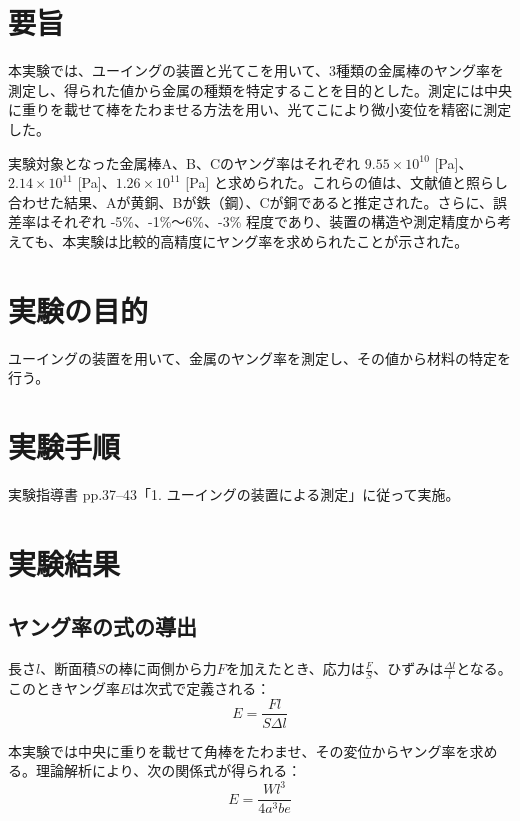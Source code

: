 \documentclass[a4paper,11pt,dvipdfmx]{jsarticle}
\begin{document}
\maketitle

\section{要旨}
本実験では、ユーイングの装置と光てこを用いて、3種類の金属棒のヤング率を測定し、得られた値から金属の種類を特定することを目的とした。測定には中央に重りを載せて棒をたわませる方法を用い、光てこにより微小変位を精密に測定した。

実験対象となった金属棒A、B、Cのヤング率はそれぞれ \(9.55 \times 10^{10}\) [Pa]、\(2.14 \times 10^{11}\) [Pa]、\(1.26 \times 10^{11}\) [Pa] と求められた。これらの値は、文献値と照らし合わせた結果、Aが黄銅、Bが鉄（鋼）、Cが銅であると推定された。さらに、誤差率はそれぞれ -5\%、-1\%〜6\%、-3\% 程度であり、装置の構造や測定精度から考えても、本実験は比較的高精度にヤング率を求められたことが示された。

\section{実験の目的}
ユーイングの装置を用いて、金属のヤング率を測定し、その値から材料の特定を行う。

\section{実験手順}
実験指導書 pp.37--43「1. ユーイングの装置による測定」に従って実施。

\section{実験結果}

\subsection{ヤング率の式の導出}
長さ\( l \)、断面積\( S \)の棒に両側から力\( F \)を加えたとき、応力は\( \frac{F}{S} \)、ひずみは\( \frac{\Delta l}{l} \)となる。
このときヤング率\( E \)は次式で定義される：
\begin{equation}
E = \frac{F l}{S \Delta l}
\end{equation}

本実験では中央に重りを載せて角棒をたわませ、その変位からヤング率を求める。理論解析により、次の関係式が得られる：
\begin{equation}
E = \frac{W l^3}{4 a^3 b e}
\end{equation}
\end{document}

